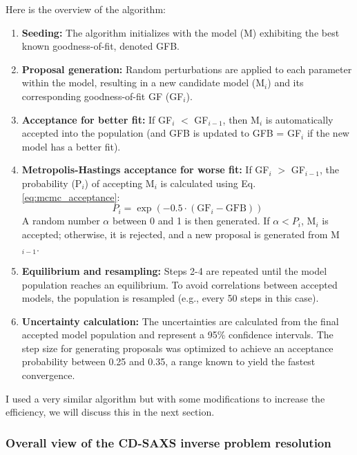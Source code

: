 Here is the overview of the algorithm:

\begin{enumerate}
    \item \textbf{Seeding:} The algorithm initializes with the model (M) exhibiting the best known goodness-of-fit, denoted GFB.
    \item \textbf{Proposal generation:} Random perturbations are applied to each parameter within the model, resulting in a new candidate model (M$_i$) and its corresponding goodness-of-fit GF (GF$_i$).
    \item \textbf{Acceptance for better fit:} If GF$_i$ $<$ GF$_{i-1}$, then M$_i$ is automatically accepted into the population (and GFB is updated to GFB = GF$_i$ if the new model has a better fit).
    \item \textbf{Metropolis-Hastings acceptance for worse fit:} If GF$_i$ $>$ GF$_{i-1}$, the probability (P$_i$) of accepting M$_i$ is calculated using Eq. \eqref{eq:mcmc_acceptance}:
    \begin{equation}
        P_i = \exp \left( -0.5 \cdot (\text{GF}_i - \text{GFB}) \right) \label{eq:mcmc_acceptance}
    \end{equation}
    A random number $\alpha$ between 0 and 1 is then generated. If $\alpha < P_i$, M$_i$ is accepted; otherwise, it is rejected, and a new proposal is generated from M$_{i-1}$.
    \item \textbf{Equilibrium and resampling:} Steps 2-4 are repeated until the model population reaches an equilibrium. To avoid correlations between accepted models, the population is resampled (e.g., every 50 steps in this case).
    \item \textbf{Uncertainty calculation:} The uncertainties are calculated from the final accepted model population and represent a 95\% confidence intervals. The step size for generating proposals was optimized to achieve an
    acceptance probability between 0.25 and 0.35, a range known to yield the fastest convergence.
\end{enumerate}

I used a very similar algorithm but with some modifications to increase the efficiency, we will discuss this in the next section.

\subsubsection{Overall view of the CD-SAXS inverse problem resolution}

\medskip

